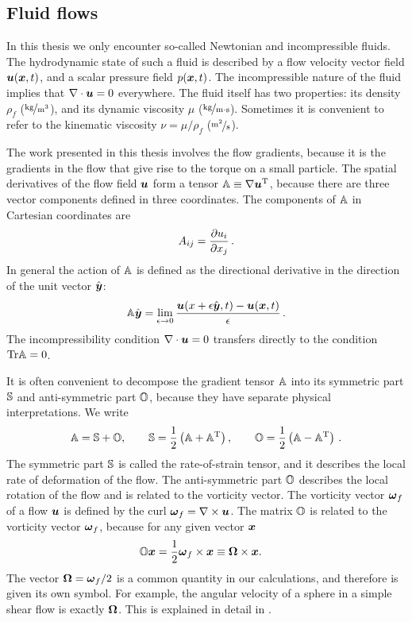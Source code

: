 \documentclass[thesis.tex]{subfiles}
\begin{document}
\subsection{Fluid flows}\label{sec:fluidflows}

In this thesis we only encounter so-called Newtonian and incompressible fluids. The hydrodynamic state of such a fluid is described by a flow velocity vector field $\mbox{\boldmath$u$}(\mbox{\boldmath$x$},t)$, and a scalar pressure field $p(\mbox{\boldmath$x$}, t)$. The incompressible nature of the fluid implies that $\nabla \cdot \mbox{\boldmath$u$} = 0$ everywhere.
The fluid itself has two properties: its density $\rho_f$ ($\unitfrac{kg}{m^3}$), and its dynamic viscosity $\mu$ ($\unitfrac{kg}{m\cdot s}$). Sometimes it is convenient to refer to the kinematic viscosity $\nu = \mu / \rho_f$ ($\unitfrac{m^2}{s}$).

The work presented in this thesis involves the flow gradients, because it is the gradients in the flow that give rise to the torque on a small particle. The spatial derivatives of the flow field $\mbox{\boldmath$u$}$ form a tensor $\mathbb{A} \equiv \nabla \mbox{\boldmath$u$}^{\mathrm T}$, because there are three vector components defined in three coordinates. The components of $\mathbb{A}$ in Cartesian coordinates are
\begin{align}
A_{ij}=\frac{\partial u_i}{\partial x_j}\,.	
\end{align}
In general the action of $\mathbb{A}$ is defined as the directional derivative in the direction of the unit vector $\hat{\mbox{\boldmath$y$}}$:
\begin{align}
 	\mathbb{A}\hat{\mbox{\boldmath$y$}} = \lim_{\epsilon\to 0}\frac{\mbox{\boldmath$u$}(x+\epsilon \hat{\mbox{\boldmath$y$}},t)-\mbox{\boldmath$u$}(\mbox{\boldmath$x$}, t)}{\epsilon}\,.
\end{align}
The incompressibility condition $\nabla\cdot\mbox{\boldmath$u$}=0$ transfers directly to the condition $\mbox{Tr} \mathbb{A}=0$.

It is often convenient to decompose the gradient tensor $\mathbb{A}$ into its symmetric part $\mathbb{S}$ and anti-symmetric part $\mathbb{O}$, because they have separate physical interpretations. We write
\begin{align}
	\mathbb{A} = \mathbb{S} + \mathbb{O},\qquad
	\mathbb{S} = \frac{1}{2}\left(\mathbb{A} + \mathbb{A}^{\mathrm T}\right),\qquad
	\mathbb{O} = \frac{1}{2}\left(\mathbb{A} - \mathbb{A}^{\mathrm T}\right)\,.
\end{align}
The symmetric part $\mathbb{S}$ is called the rate-of-strain tensor, and it describes the local rate of deformation of the flow. The anti-symmetric part $\mathbb{O}$ describes the local rotation of the flow and is related to the vorticity vector. The vorticity vector $\mbox{\boldmath$\omega$}_f$ of a flow $\mbox{\boldmath$u$}$ is defined by the curl $\mbox{\boldmath$\omega$}_f = \nabla \times \mbox{\boldmath$u$}$. The matrix $\mathbb{O}$ is related to the vorticity vector $\mbox{\boldmath$\omega$}_f$, because for any given vector $\mbox{\boldmath$x$}$
\begin{align}
	\ma O \ve x &= \frac{1}{2}\ve \omega_f \cross \ve x \equiv \ve \Omega \cross \ve x.\eqnlab{vorticityOdef}
\end{align}
The vector $\mbox{\boldmath$\Omega$}=\mbox{\boldmath$\omega$}_f/2$ is a common quantity in our calculations, and therefore is given its own symbol. For example, the angular velocity of a sphere in a simple shear flow is exactly $\mbox{\boldmath$\Omega$}$. This is explained in detail in .
\end{document}
